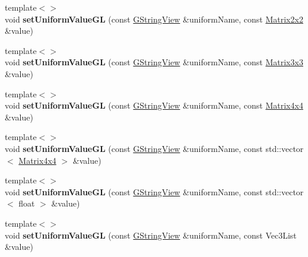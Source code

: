 \begin{Indent}
\begin{DoxyCompactItemize}
\item 
\mbox{\label{classrev_1_1_shader_program_a0e0089754f59ab65f9a2deef96e44602}} 
{\footnotesize template$<$$>$ }\\void {\bfseries set\+Uniform\+Value\+GL} (const \mbox{\hyperlink{classrev_1_1_g_string_view}{G\+String\+View}} \&uniform\+Name, const \mbox{\hyperlink{classrev_1_1_square_matrix}{Matrix2x2}} \&value)
\item 
\mbox{\label{classrev_1_1_shader_program_a507260e825e13652164141fc66b260e7}} 
{\footnotesize template$<$$>$ }\\void {\bfseries set\+Uniform\+Value\+GL} (const \mbox{\hyperlink{classrev_1_1_g_string_view}{G\+String\+View}} \&uniform\+Name, const \mbox{\hyperlink{classrev_1_1_square_matrix}{Matrix3x3}} \&value)
\item 
\mbox{\label{classrev_1_1_shader_program_a1e4289f8284c6fb8e88ec5975aa33f1a}} 
{\footnotesize template$<$$>$ }\\void {\bfseries set\+Uniform\+Value\+GL} (const \mbox{\hyperlink{classrev_1_1_g_string_view}{G\+String\+View}} \&uniform\+Name, const \mbox{\hyperlink{classrev_1_1_square_matrix}{Matrix4x4}} \&value)
\item 
\mbox{\label{classrev_1_1_shader_program_aebe5863305f175627f40ad1d82b6712a}} 
{\footnotesize template$<$$>$ }\\void {\bfseries set\+Uniform\+Value\+GL} (const \mbox{\hyperlink{classrev_1_1_g_string_view}{G\+String\+View}} \&uniform\+Name, const std\+::vector$<$ \mbox{\hyperlink{classrev_1_1_square_matrix}{Matrix4x4}} $>$ \&value)
\item 
\mbox{\label{classrev_1_1_shader_program_a4697961ddb120f0ee609cda258544ad7}} 
{\footnotesize template$<$$>$ }\\void {\bfseries set\+Uniform\+Value\+GL} (const \mbox{\hyperlink{classrev_1_1_g_string_view}{G\+String\+View}} \&uniform\+Name, const std\+::vector$<$ float $>$ \&value)
\item 
\mbox{\label{classrev_1_1_shader_program_aba8ec9888a6152dbf5727bef73c35fcc}} 
{\footnotesize template$<$$>$ }\\void {\bfseries set\+Uniform\+Value\+GL} (const \mbox{\hyperlink{classrev_1_1_g_string_view}{G\+String\+View}} \&uniform\+Name, const Vec3\+List \&value)

\end{DoxyCompactItemize}
\end{Indent}
